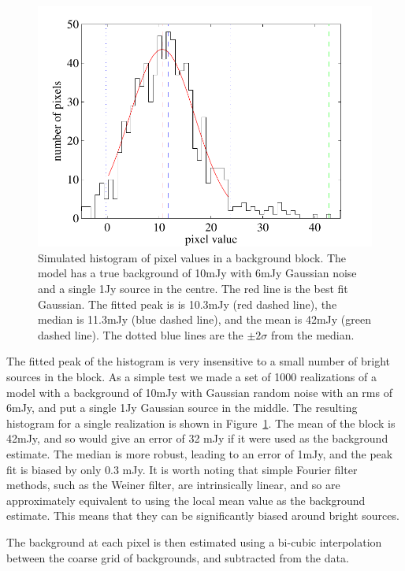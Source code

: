 \documentclass[useAMS,usenatbib]{mn2e}
\begin{document}
\begin{figure}
\includegraphics[scale=0.6]{bhist_model.pdf}
\caption{\protect\label{bhist_model} Simulated histogram of pixel
  values in a background block. The model has a true background of
  10mJy with 6mJy Gaussian noise and a single 1Jy source in the
  centre. The red line is the best fit Gaussian.  The fitted peak is
  is 10.3mJy (red dashed line), the median is 11.3mJy (blue dashed
  line), and the mean is 42mJy (green dashed line). The dotted blue
  lines are the $\pm 2 \sigma $ from the median.}
\end{figure}

The fitted peak of the histogram is very insensitive to a small number
of bright sources in the block. As a simple test we made a set of 1000
realizations of a model with a background of 10mJy with Gaussian
random noise with an rms of 6mJy, and put a single 1Jy Gaussian source
in the middle. The resulting histogram for a single realization is
shown in Figure~\ref{bhist_model}. The mean of the block is 42mJy, and
so would give an error of 32 mJy if it were used as the background
estimate. The median is more robust, leading to an error of 1mJy, and
the peak fit is biased by only 0.3 mJy.  It is worth noting that
simple Fourier filter methods, such as the Weiner filter, are
intrinsically linear, and so are approximately equivalent to using the
local mean value as the background estimate. This means that they can be
significantly biased around bright sources.

The background at each pixel is then estimated using a bi-cubic
interpolation between the coarse grid of backgrounds, and subtracted
from the data. 
\end{document}
